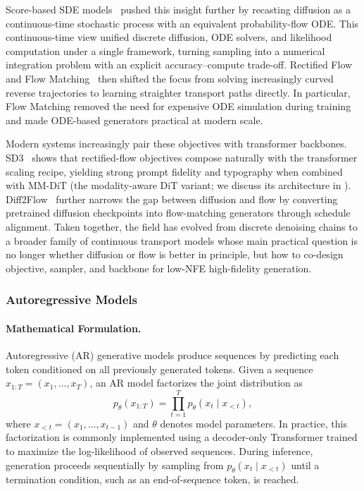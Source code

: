 \documentclass{llmxive}
\begin{document}
Score-based SDE models~\citep{song2021scorebasedgenerativemodelingstochastic} pushed this insight further by recasting diffusion as a continuous-time stochastic process with an equivalent probability-flow ODE. This continuous-time view unified discrete diffusion, ODE solvers, and likelihood computation under a single framework, turning sampling into a numerical integration problem with an explicit accuracy--compute trade-off. Rectified Flow~\citep{liu2022flow} and Flow Matching~\citep{lipman2023flowmatchinggenerativemodeling} then shifted the focus from solving increasingly curved reverse trajectories to learning straighter transport paths directly. In particular, Flow Matching removed the need for expensive ODE simulation during training and made ODE-based generators practical at modern scale.

Modern systems increasingly pair these objectives with transformer backbones. SD3~\citep{esser2024stablediffusion3} shows that rectified-flow objectives compose naturally with the transformer scaling recipe, yielding strong prompt fidelity and typography when combined with MM-DiT (the modality-aware DiT variant; we discuss its architecture in ). Diff2Flow~\citep{schusterbauer2025diff2flowtrainingflowmatching} further narrows the gap between diffusion and flow by converting pretrained diffusion checkpoints into flow-matching generators through schedule alignment. Taken together, the field has evolved from discrete denoising chains to a broader family of continuous transport models whose main practical question is no longer whether diffusion or flow is better in principle, but how to co-design objective, sampler, and backbone for low-NFE high-fidelity generation.



\subsubsection{Autoregressive Models}

\paragraph{Mathematical Formulation.}
Autoregressive (AR) generative models produce sequences by predicting each token conditioned on all previously generated tokens. Given a sequence $x_{1:T} = (x_1, \ldots, x_T)$, an AR model factorizes the joint distribution as
\begin{equation}
p_\theta(x_{1:T}) = \prod_{t=1}^T p_\theta(x_t \mid x_{<t}),
\end{equation}
where $x_{<t} = (x_1, \ldots, x_{t-1})$ and $\theta$ denotes model parameters. In practice, this factorization is commonly implemented using a decoder-only Transformer trained to maximize the log-likelihood of observed sequences. During inference, generation proceeds sequentially by sampling from $p_\theta(x_t \mid x_{<t})$ until a termination condition, such as an end-of-sequence token, is reached.
\end{document}
